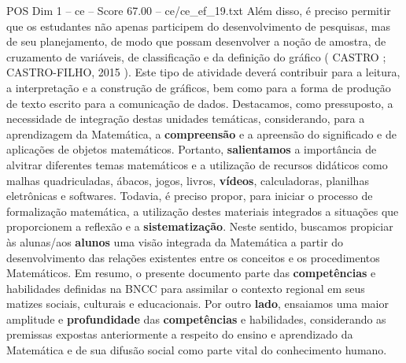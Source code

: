 \begin{textsample}{POS Dim 1 – ce – Score 67.00 – ce/ce\_ef\_19.txt}
Além disso, é preciso permitir que os estudantes não apenas participem do desenvolvimento de pesquisas, mas de seu planejamento, de modo que possam desenvolver a noção de amostra, de cruzamento de variáveis, de classificação e da definição do gráfico ( CASTRO ; CASTRO-FILHO, 2015 ).
Este tipo de atividade deverá contribuir para a leitura, a interpretação e a construção de gráficos, bem como para a forma de produção de texto escrito para a comunicação de dados.
Destacamos, como pressuposto, a necessidade de integração destas unidades temáticas, considerando, para a aprendizagem da Matemática, a \textbf{compreensão} e a apreensão do significado e de aplicações de objetos matemáticos.
Portanto, \textbf{salientamos} a importância de alvitrar diferentes temas matemáticos e a utilização de recursos didáticos como malhas quadriculadas, ábacos, jogos, livros, \textbf{vídeos}, calculadoras, planilhas eletrônicas e softwares.
Todavia, é preciso propor, para iniciar o processo de formalização matemática, a utilização destes materiais integrados a situações que proporcionem a reflexão e a \textbf{sistematização}.
Neste sentido, buscamos propiciar às alunas/aos \textbf{alunos} uma visão integrada da Matemática a partir do desenvolvimento das relações existentes entre os conceitos e os procedimentos Matemáticos.
Em resumo, o presente documento parte das \textbf{competências} e habilidades definidas na BNCC para assimilar o contexto regional em seus matizes sociais, culturais e educacionais.
Por outro \textbf{lado}, ensaiamos uma maior amplitude e \textbf{profundidade} das \textbf{competências} e habilidades, considerando as premissas expostas anteriormente a respeito do ensino e aprendizado da Matemática e de sua difusão social como parte vital do conhecimento humano.

\end{textsample}
